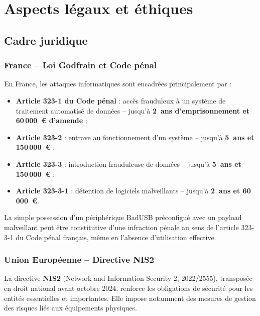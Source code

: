 \documentclass[12pt,a4paper]{report}
\begin{document}
\chapter{Aspects légaux et éthiques}
\label{chap:legal}

\section{Cadre juridique}

\subsection{France -- Loi Godfrain et Code pénal}

En France, les attaques informatiques sont encadrées principalement par :

\begin{itemize}
  \item \textbf{Article 323-1 du Code pénal} : accès frauduleux à un système de traitement automatisé de données -- jusqu'à \textbf{2~ans d'emprisonnement et 60\,000~€ d'amende} ;
  \item \textbf{Article 323-2} : entrave au fonctionnement d'un système -- jusqu'à \textbf{5~ans et 150\,000~€} ;
  \item \textbf{Article 323-3} : introduction frauduleuse de données -- jusqu'à \textbf{5~ans et 150\,000~€} ;
  \item \textbf{Article 323-3-1} : détention de logiciels malveillants -- jusqu'à \textbf{2~ans et 60\,000~€}.
\end{itemize}

\begin{alertbox}
La simple possession d'un périphérique BadUSB préconfigué avec un payload malveillant peut être constitutive d'une infraction pénale au sens de l'article 323-3-1 du Code pénal français, même en l'absence d'utilisation effective.
\end{alertbox}

\subsection{Union Européenne -- Directive NIS2}

La directive \textbf{NIS2} (Network and Information Security 2, 2022/2555), transposée en droit national avant octobre 2024, renforce les obligations de sécurité pour les entités essentielles et importantes. Elle impose notamment des mesures de gestion des risques liés aux équipements physiques.
\end{document}
